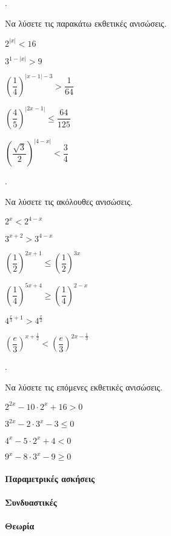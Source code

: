 \documentclass[11pt,a4paper,twocolumn]{article}
\newcounter{askhsh}
\newcommand{\askhsh}{\large\theaskhsh.\ \addtocounter{askhsh}{1}}
\begin{document}
\askhsh Να λύσετε τις παρακάτω εκθετικές ανισώσεις.
\begin{multicols}{2}
\begin{alist}
\item $2^{|x|}<16$
\item $3^{1-|x|}>9$
\item $\left(\dfrac{1}{4}\right)^{|x-1|-3}>\dfrac{1}{64}$
\item $\left(\dfrac{4}{5}\right)^{|2x-1|}\leq\dfrac{64}{125}$
\item $\left(\dfrac{\sqrt{3}}{2}\right)^{|4-x|}<\dfrac{3}{4}$
\end{alist}
\end{multicols}
\askhsh Να λύσετε τις ακόλουθες ανισώσεις.
\begin{multicols}{2}
\begin{alist}[leftmargin=4mm]
\item $2^x<2^{4-x}$
\item $3^{x+2}>3^{4-x}$
\item $\left(\dfrac{1}{2}\right)^{2x+1}\leq\left(\dfrac{1}{2}\right)^{3x}$
\item $\left(\dfrac{1}{4}\right)^{5x+4}\geq\left(\dfrac{1}{4}\right)^{2-x}$
\item $4^{\frac{x}{3}+1}>4^{\frac{x}{2}}$
\item $\left(\dfrac{e}{3}\right)^{x+\frac{1}{2}}<\left(\dfrac{e}{3}\right)^{2x-\frac{1}{3}}$
\end{alist}
\end{multicols}
\askhsh Να λύσετε τις επόμενες εκθετικές ανισώσεις.
\begin{alist}
\item $2^{2x}-10\cdot 2^x+16>0$
\item $3^{2x}-2\cdot 3^{x}-3\leq 0$
\item $4^{x}-5\cdot 2^x+4<0$
\item $9^{x}-8\cdot3^x-9\geq 0$
\end{alist}
\paragraph{Παραμετρικές ασκήσεις}
\paragraph{Συνδυαστικές}
\paragraph{Θεωρία}
\end{document}
